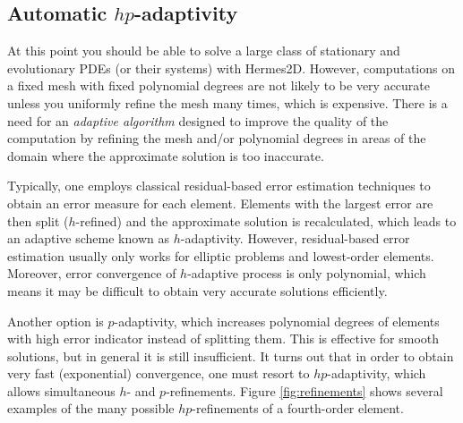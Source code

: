 
\subsection{Automatic $hp$-adaptivity}

At this point you should be able to solve a large class of stationary and evolutionary PDEs
(or their systems) with Hermes2D. However, computations on a fixed mesh with fixed 
polynomial degrees are not likely to be very accurate unless you uniformly refine the mesh
many times, which is expensive. There is a need for an {\it adaptive algorithm} designed
to improve the quality of the computation by refining the mesh and/or polynomial degrees
in areas of the domain where the approximate solution is too inaccurate.

Typically, one employs classical residual-based error estimation techniques to obtain an
error measure for each element. Elements with the largest error are then split ($h$-refined)
and the approximate solution is recalculated, which leads to an adaptive scheme known as
$h$-adaptivity. However, residual-based error estimation usually only works for elliptic
problems and lowest-order elements. Moreover, error convergence of $h$-adaptive process
is only polynomial, which means it may be difficult to obtain very accurate solutions efficiently.

Another option is $p$-adaptivity, which increases polynomial degrees of elements with high
error indicator instead of splitting them. This is effective for smooth solutions, but in 
general it is still insufficient. It turns out that in order to obtain very fast (exponential)
convergence, one must resort to $hp$-adaptivity, which allows simultaneous $h$- and $p$-refinements.
Figure \ref{fig:refinements} shows several examples of the many possible $hp$-refinements of
a fourth-order element.

